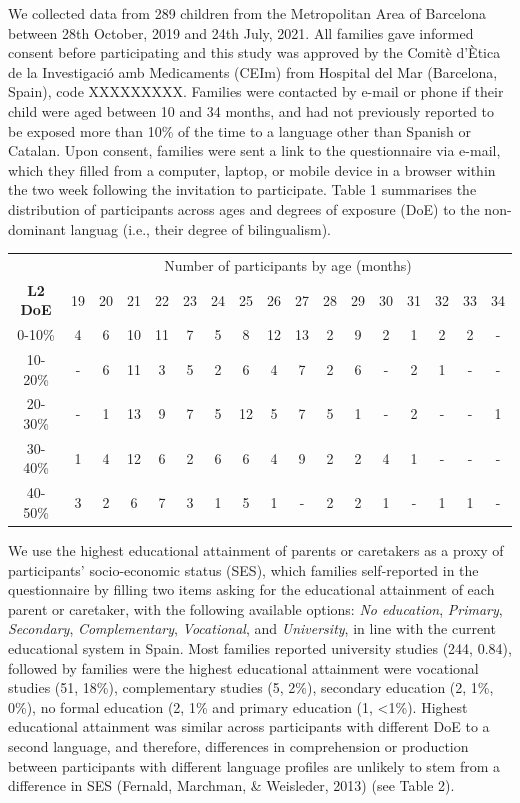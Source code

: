 \documentclass[
  english,
  man,man,floatsintext]{apa6}
\begin{document}
We collected data from 289 children from the Metropolitan Area of Barcelona between 28th October, 2019 and 24th July, 2021. All families gave informed consent before participating and this study was approved by the Comitè d'Ètica de la Investigació amb Medicaments (CEIm) from Hospital del Mar (Barcelona, Spain), code XXXXXXXXX. Families were contacted by e-mail or phone if their child were aged between 10 and 34 months, and had not previously reported to be exposed more than 10\% of the time to a language other than Spanish or Catalan. Upon consent, families were sent a link to the questionnaire via e-mail, which they filled from a computer, laptop, or mobile device in a browser within the two week following the invitation to participate. Table 1 summarises the distribution of participants across ages and degrees of exposure (DoE) to the non-dominant languag (i.e., their degree of bilingualism).

\captionsetup[table]{labelformat=empty,skip=1pt}
\begin{longtable}{ccccccccccccccccc}
\toprule
& \multicolumn{16}{c}{Number of participants by age (months)} \\ 
 \cmidrule(lr){2-17}
\textbf{L2 DoE} & 19 & 20 & 21 & 22 & 23 & 24 & 25 & 26 & 27 & 28 & 29 & 30 & 31 & 32 & 33 & 34 \\ 
\midrule
0-10\% & 4 & 6 & 10 & 11 & 7 & 5 & 8 & 12 & 13 & 2 & 9 & 2 & 1 & 2 & 2 & - \\ 
10-20\% & - & 6 & 11 & 3 & 5 & 2 & 6 & 4 & 7 & 2 & 6 & - & 2 & 1 & - & - \\ 
20-30\% & - & 1 & 13 & 9 & 7 & 5 & 12 & 5 & 7 & 5 & 1 & - & 2 & - & - & 1 \\ 
30-40\% & 1 & 4 & 12 & 6 & 2 & 6 & 6 & 4 & 9 & 2 & 2 & 4 & 1 & - & - & - \\ 
40-50\% & 3 & 2 & 6 & 7 & 3 & 1 & 5 & 1 & - & 2 & 2 & 1 & - & 1 & 1 & - \\ 
\bottomrule
\end{longtable}

We use the highest educational attainment of parents or caretakers as a proxy of participants' socio-economic status (SES), which families self-reported in the questionnaire by filling two items asking for the educational attainment of each parent or caretaker, with the following available options: \emph{No education}, \emph{Primary}, \emph{Secondary}, \emph{Complementary}, \emph{Vocational}, and \emph{University}, in line with the current educational system in Spain. Most families reported university studies (244, 0.84), followed by families were the highest educational attainment were vocational studies (51, 18\%), complementary studies (5, 2\%), secondary education (2, 1\%, 0\%), no formal education (2, 1\% and primary education (1, \textless1\%). Highest educational attainment was similar across participants with different DoE to a second language, and therefore, differences in comprehension or production between participants with different language profiles are unlikely to stem from a difference in SES (Fernald, Marchman, \& Weisleder, 2013) (see Table 2).
\end{document}
